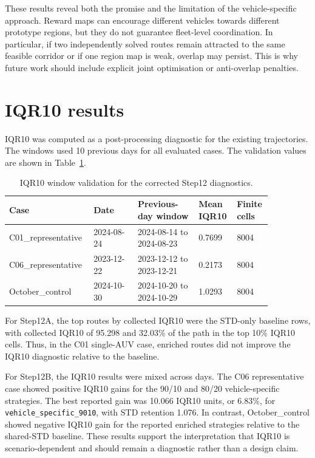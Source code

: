 These results reveal both the promise and the limitation of the vehicle-specific approach. Reward maps can encourage different vehicles towards different prototype regions, but they do not guarantee fleet-level coordination. In particular, if two independently solved routes remain attracted to the same feasible corridor or if one region map is weak, overlap may persist. This is why future work should include explicit joint optimisation or anti-overlap penalties.

\section{IQR10 results}

IQR10 was computed as a post-processing diagnostic for the existing trajectories. The windows used 10 previous days for all evaluated cases. The validation values are shown in Table~\ref{tab:iqr10_windows}.

\begin{table}[htbp]
    \centering
    \small
    \caption{IQR10 window validation for the corrected Step12 diagnostics.}
    \label{tab:iqr10_windows}
    \begin{tabular}{p{0.24\linewidth}p{0.16\linewidth}p{0.22\linewidth}p{0.12\linewidth}p{0.12\linewidth}}
        \hline
        Case & Date & Previous-day window & Mean IQR10 & Finite cells \\
        \hline
        C01\_representative & 2024-08-24 & 2024-08-14 to 2024-08-23 & 0.7699 & 8004 \\
        C06\_representative & 2023-12-22 & 2023-12-12 to 2023-12-21 & 0.2173 & 8004 \\
        October\_control & 2024-10-30 & 2024-10-20 to 2024-10-29 & 1.0293 & 8004 \\
        \hline
    \end{tabular}
\end{table}

For Step12A, the top routes by collected IQR10 were the STD-only baseline rows, with collected IQR10 of 95.298 and 32.03\% of the path in the top 10\% IQR10 cells. Thus, in the C01 single-AUV case, enriched routes did not improve the IQR10 diagnostic relative to the baseline.

For Step12B, the IQR10 results were mixed across days. The C06 representative case showed positive IQR10 gains for the 90/10 and 80/20 vehicle-specific strategies. The best reported gain was 10.066 IQR10 units, or 6.83\%, for \texttt{vehicle\_specific\_9010}, with STD retention 1.076. In contrast, October\_control showed negative IQR10 gain for the reported enriched strategies relative to the shared-STD baseline. These results support the interpretation that IQR10 is scenario-dependent and should remain a diagnostic rather than a design claim.

